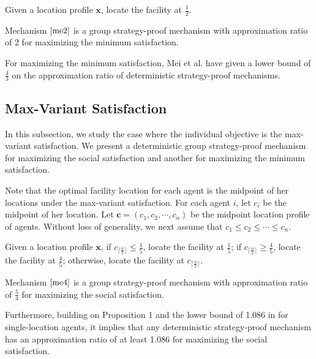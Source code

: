 \documentclass[runningheads]{11llncst}
\begin{document}
\begin{mechanism} \label{me2}
    Given a location profile $\textbf{x}$, locate the facility at $\frac{1}{2}$.
\end{mechanism}

\begin{theorem} \label{th2}
     Mechanism $\ref{me2}$ is a group strategy-proof mechanism with  approximation ratio of $2$ for maximizing the minimum   satisfaction. 
\end{theorem}

For maximizing the minimum satisfaction, Mei et al. \cite{mei2019facility} have given a lower bound of $\frac{4}{3}$ on the approximation ratio of deterministic strategy-proof mechanisms.


\subsection{Max-Variant Satisfaction}
In this subsection, we study the case where the individual objective is the max-variant satisfaction. We present a deterministic group strategy-proof mechanism  for maximizing the social satisfaction and another for maximizing the minimum satisfaction. 

Note that the optimal facility location for each agent is the midpoint of her locations under the max-variant satisfaction.  For each agent $i$, let $c_i$ be the midpoint of her location.  Let $\textbf{c}=( c_1, c_2, \cdots, c_n)$ be the midpoint location profile of agents. Without loss of generality, we next assume that $c_1\leq c_2\leq \cdots\leq c_n$.

\begin{mechanism}\label{me4}
     Given a location profile $\textbf{x}$, if $c_{\lceil\frac{n}{2}\rceil}\leq\frac{1}{5}$, locate the facility at $\frac{1}{5}$; if $c_{\lceil\frac{n}{2}\rceil}\geq\frac{4}{5}$, locate the facility at $\frac{4}{5}$; otherwise, locate the facility at $c_{\lceil\frac{n}{2}\rceil}$.
\end{mechanism}



\begin{theorem}
    Mechanism $\ref{me4}$ is a group strategy-proof mechanism with approximation ratio of $\frac{5}{4}$ for maximizing the social satisfaction. 
\end{theorem}

Furthermore, building on Proposition 1 and the lower bound of  1.086 in \cite{mei2019facility} for single-location agents, it implies that any deterministic strategy-proof mechanism has an approximation ratio of at least 1.086 for maximizing the social satisfaction.
\end{document}
